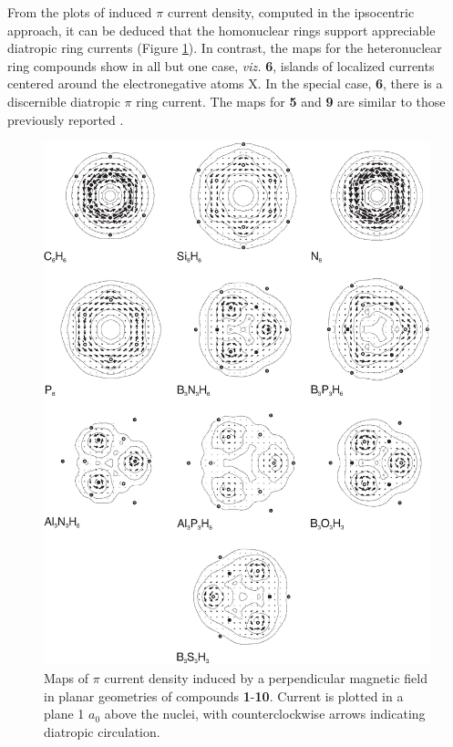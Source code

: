 From the plots of induced $\pi$ current density, computed in the ipsocentric approach, it can be deduced that the homonuclear rings support appreciable diatropic ring currents (Figure \ref{ch6.figure3}).
In contrast, the maps for the heteronuclear ring compounds show in all but one case, \textit{viz.} \textbf{6}, islands of localized currents centered around the electronegative atoms X. In the special case, \textbf{6}, there is a discernible diatropic $\pi$ ring current. The maps for \textbf{5} and \textbf{9} are similar to those previously reported \cite{fowler1,fowler2}.
\begin{figure}[htbp]
\center
\includegraphics[scale=0.72]{inorganic/figures/figure3.eps}
\caption{Maps of $\pi$ current density induced by a perpendicular magnetic
field in planar geometries of compounds \textbf{1}-\textbf{10}. Current is plotted in
a plane 1 $a_{0}$ above the nuclei, with counterclockwise arrows indicating diatropic
circulation.}
\label{ch6.figure3}
\end{figure}
